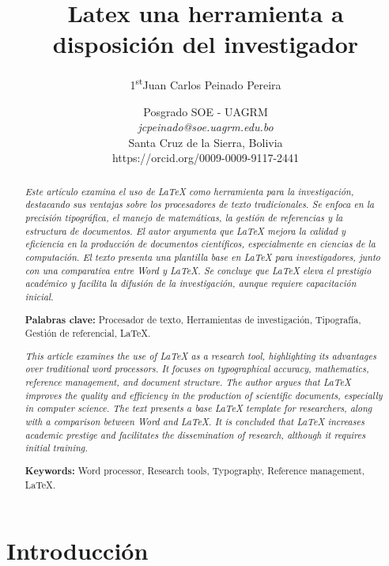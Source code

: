 \documentclass[10pt,twocolumn,a4paper]{article}
\title{\Huge Latex una herramienta a disposición del investigador\\}
\author{\Large {1\textsuperscript{st}Juan Carlos Peinado Pereira}}
\date{\normalsize Posgrado SOE - UAGRM\\
\textit{jcpeinado@soe.uagrm.edu.bo}\\
Santa Cruz de la Sierra, Bolivia \\
https://orcid.org/0009-0009-9117-2441}
\begin{document}
\maketitle

\begin{abstract}
    \textit{\normalsize Este artículo examina el uso de LaTeX como herramienta para la investigación, destacando sus ventajas sobre los procesadores de texto tradicionales. 
    Se enfoca en la precisión tipográfica, el manejo de matemáticas, la gestión de referencias y la estructura de documentos. 
    El autor argumenta que LaTeX mejora la calidad y eficiencia en la producción de documentos científicos, especialmente en ciencias de la computación. El texto presenta una plantilla base en LaTeX para investigadores, junto con una comparativa entre Word y LaTeX.
    Se concluye que LaTeX eleva el prestigio académico y facilita la difusión de la investigación, aunque requiere capacitación inicial.} 
    \vspace{0.5cm}

    \textbf{Palabras clave:} Procesador de texto, Herramientas de investigación, Tipografía, Gestión de referencial, LaTeX.
\end{abstract}


\begin{abstract}
    \textit{\normalsize This article examines the use of LaTeX as a research tool, highlighting its advantages over traditional word processors. 
    It focuses on typographical accuracy, mathematics, reference management, and document structure. 
    The author argues that LaTeX improves the quality and efficiency in the production of scientific documents, especially in computer science. 
    The text presents a base LaTeX template for researchers, along with a comparison between Word and LaTeX. 
    It is concluded that LaTeX increases academic prestige and facilitates the dissemination of research, although it requires initial training.}    
    \vspace{0.5cm}

    \textbf{Keywords:} Word processor, Research tools, Typography, Reference management, LaTeX.
\end{abstract}


    \section{Introducción}
\end{document}
